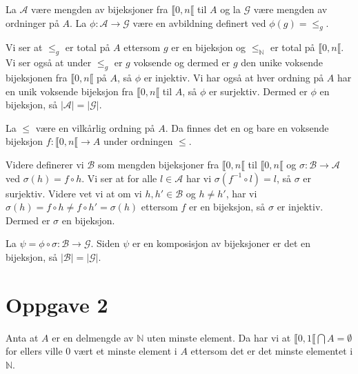 \documentclass{article}[norsk]
\begin{document}
La $\mathcal{A}$ være mengden av bijeksjoner fra $\llbracket 0,n\llbracket$ til $A$ og la $\mathcal{G}$ være mengden av ordninger på $A$. La $\phi:\mathcal{A}\rightarrow\mathcal{G}$ være en avbildning definert ved $\phi(g)=\leq_g$. 

Vi ser at $\leq_g$ er total på $A$ ettersom $g$ er en bijeksjon og $\leq_\mathbb{N}$ er total på $\llbracket 0,n\llbracket$. Vi ser også at under $\leq_g$ er $g$ voksende og dermed er $g$ den unike voksende bijeksjonen fra $\llbracket 0,n\llbracket$ på $A$, så $\phi$ er injektiv. Vi har også at hver ordning på $A$ har en unik voksende bijeksjon fra $\llbracket 0,n\llbracket$ til $A$, så $\phi$ er surjektiv. Dermed er $\phi$ en bijeksjon, så $\left|\mathcal{A}\right|=\left|\mathcal{G}\right|$. 

 La $\leq$ være en vilkårlig ordning på $A$. Da finnes det en og bare en voksende bijeksjon $f:\llbracket 0,n\llbracket\rightarrow A$ under ordningen $\leq$.

Videre definerer vi $\mathcal{B}$ som mengden bijeksjoner fra $\llbracket 0,n\llbracket$ til $\llbracket 0,n\llbracket$ og $\sigma:\mathcal{B}\rightarrow\mathcal{A}$ ved $\sigma(h)=f\circ h$. Vi ser at for alle $l\in\mathcal{A}$ har vi $\sigma\left(f^{-1}\circ l\right)=l$, så $\sigma$ er surjektiv. Videre vet vi at om vi $h,h'\in\mathcal{B}$ og $h\neq h'$, har vi $\sigma(h)=f\circ h\neq f\circ h'=\sigma(h)$ ettersom $f$ er en bijeksjon, så $\sigma$ er injektiv. Dermed er $\sigma$ en bijeksjon.

La $\psi=\phi\circ\sigma:\mathcal{B}\rightarrow\mathcal{G}$. Siden $\psi$ er en komposisjon av bijeksjoner er det en bijeksjon, så $\left|\mathcal{B}\right|=\left|\mathcal{G}\right|$.

\section*{Oppgave 2}
Anta at $A$ er en delmengde av $\mathbb{N}$ uten minste element. Da har vi at $\llbracket 0,1\llbracket\bigcap A=\emptyset$ for ellers ville 0 vært et minste element i $A$ ettersom det er det minste elementet i $\mathbb{N}$. 
\end{document}
